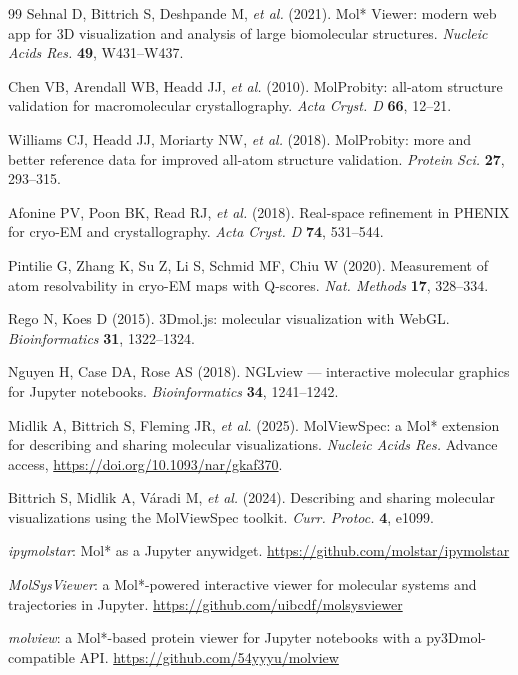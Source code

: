 \documentclass[11pt]{article}
\begin{document}
\begin{thebibliography}{99}
 Sehnal D, Bittrich S, Deshpande M, \emph{et al.} (2021).
Mol* Viewer: modern web app for 3D visualization and analysis of large
biomolecular structures. \emph{Nucleic Acids Res.} \textbf{49}, W431--W437.

 Chen VB, Arendall WB, Headd JJ, \emph{et al.} (2010).
MolProbity: all-atom structure validation for macromolecular crystallography.
\emph{Acta Cryst. D} \textbf{66}, 12--21.

 Williams CJ, Headd JJ, Moriarty NW, \emph{et al.}
(2018). MolProbity: more and better reference data for improved all-atom
structure validation. \emph{Protein Sci.} \textbf{27}, 293--315.

 Afonine PV, Poon BK, Read RJ, \emph{et al.} (2018).
Real-space refinement in PHENIX for cryo-EM and crystallography.
\emph{Acta Cryst. D} \textbf{74}, 531--544.

 Pintilie G, Zhang K, Su Z, Li S, Schmid MF, Chiu W
(2020). Measurement of atom resolvability in cryo-EM maps with Q-scores.
\emph{Nat. Methods} \textbf{17}, 328--334.

 Rego N, Koes D (2015). 3Dmol.js: molecular
visualization with WebGL. \emph{Bioinformatics} \textbf{31}, 1322--1324.

 Nguyen H, Case DA, Rose AS (2018). NGLview ---
interactive molecular graphics for Jupyter notebooks.
\emph{Bioinformatics} \textbf{34}, 1241--1242.

 Midlik A, Bittrich S, Fleming JR, \emph{et al.} (2025).
MolViewSpec: a Mol* extension for describing and sharing molecular
visualizations. \emph{Nucleic Acids Res.} Advance access,
\url{https://doi.org/10.1093/nar/gkaf370}.

 Bittrich S, Midlik A, V\'aradi M, \emph{et al.}
(2024). Describing and sharing molecular visualizations using the
MolViewSpec toolkit. \emph{Curr. Protoc.} \textbf{4}, e1099.

 \emph{ipymolstar}: Mol* as a Jupyter anywidget.
\url{https://github.com/molstar/ipymolstar}

 \emph{MolSysViewer}: a Mol*-powered interactive
viewer for molecular systems and trajectories in Jupyter.
\url{https://github.com/uibcdf/molsysviewer}

 \emph{molview}: a Mol*-based protein viewer for Jupyter
notebooks with a py3Dmol-compatible API.
\url{https://github.com/54yyyu/molview}

\end{thebibliography}
\end{document}
